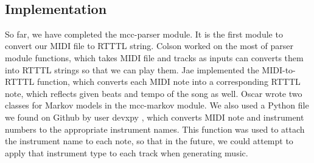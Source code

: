 \documentclass{article}
\begin{document}
 \\

\subsection{Implementation}
So far, we have completed the mcc-parser module. It is the first module to convert our MIDI file to RTTTL string. Colson worked on the most of parser module functions, which 
takes MIDI file and tracks as inputs can converts them into RTTTL strings so that we can play them. Jae implemented the MIDI-to-RTTTL function, which converts each MIDI note 
into a corresponding RTTTL note, which reflects given beats and tempo of the song as well. Oscar wrote two classes for Markov models in the mcc-markov module. We also used a
Python file we found on Github by user devxpy \cite{Midi_instruments}, which converts MIDI note and instrument numbers to the appropriate instrument names. This function was used to attach the
instrument name to each note, so that in the future, we could attempt to apply that instrument type to each track when generating music.
\end{document}
